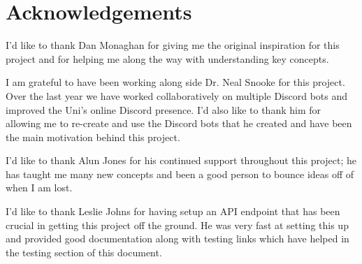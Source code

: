 \thispagestyle{empty}


\section*{\centering Acknowledgements}

I'd like to thank Dan Monaghan for giving me the original inspiration for this project and for helping me along the way with understanding key concepts. 

I am grateful to have been working along side Dr. Neal Snooke for this project. Over the last year we have worked collaboratively on multiple Discord bots and improved the Uni's online Discord presence. I'd also like to thank him for allowing me to re-create and use the Discord bots that he created and have been the main motivation behind this project.

I'd like to thank Alun Jones for his continued support throughout this project; he has taught me many new concepts and been a good person to bounce ideas off of when I am lost.

I'd like to thank Leslie Johns for having setup an API endpoint that has been crucial in getting this project off the ground. He was very fast at setting this up and provided good documentation along with testing links which have helped in the testing section of this document.


